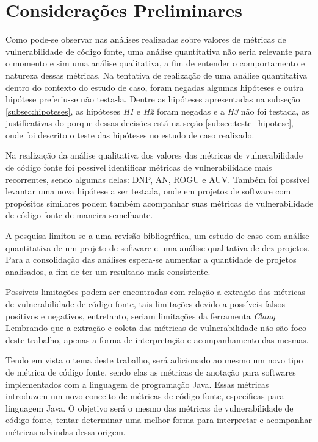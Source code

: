 \chapter{Considerações Preliminares} \label{chap:consideracoes}

Como pode-se observar nas análises realizadas sobre valores de métricas de
vulnerabilidade de código fonte, uma análise quantitativa não seria relevante
para o momento e sim uma análise qualitativa, a fim de entender o comportamento
e natureza dessas métricas. Na tentativa de realização de uma análise
quantitativa dentro do contexto do estudo de caso, foram negadas algumas
hipóteses e outra hipótese preferiu-se não testa-la. Dentre as hipóteses
apresentadas na subseção \ref{subsec:hipoteses}, as hipóteses \emph{H1} e \emph{H2}
foram negadas e a \emph{H3} não foi testada, as justificativas do porque dessas
decisões está na seção \ref{subsec:teste_hipotese}, onde foi descrito o teste
das hipóteses no estudo de caso realizado.

Na realização da análise qualitativa dos valores das métricas de vulnerabilidade
de código fonte foi possível identificar métricas de vulnerabilidade mais
recorrentes, sendo algumas delas: DNP, AN, ROGU e AUV. Também foi possível
levantar uma nova hipótese a ser testada, onde em projetos de software com
propósitos similares podem também acompanhar suas métricas de vulnerabilidade de
código fonte de maneira semelhante.

A pesquisa limitou-se a uma revisão bibliográfica, um estudo de caso com análise 
quantitativa de um projeto de software e uma análise qualitativa de dez
projetos. Para a consolidação das análises espera-se aumentar a quantidade de
projetos analisados, a fim de ter um resultado mais consistente.

Possíveis limitações podem ser encontradas com relação a extração das métricas
de vulnerabilidade de código fonte, tais limitações devido a possíveis falsos
positivos e negativos, entretanto, seriam limitações da ferramenta \emph{Clang}.
Lembrando que a extração e coleta das métricas de vulnerabilidade não são foco
deste trabalho, apenas a forma de interpretação e acompanhamento das mesmas.

Tendo em vista o tema deste trabalho, será adicionado ao mesmo um novo tipo de
métrica de código fonte, sendo elas as
métricas de anotação para softwares implementados com a linguagem de programação
Java. Essas métricas introduzem um novo conceito de métricas de código fonte,
específicas para linguagem Java. O objetivo será o mesmo das métricas de
vulnerabilidade de código fonte, tentar determinar uma melhor forma para
interpretar e acompanhar métricas advindas dessa origem.

